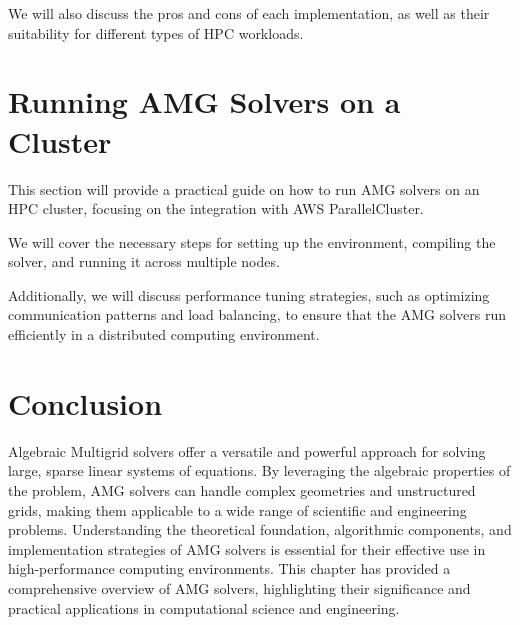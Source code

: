 We will also discuss the pros and cons of each implementation, as well as their suitability for different types of HPC workloads.

\section{Running AMG Solvers on a Cluster}
This section will provide a practical guide on how to run AMG solvers on an HPC cluster, focusing on the integration with AWS ParallelCluster. 

We will cover the necessary steps for setting up the environment, compiling the solver, and running it across multiple nodes. 

Additionally, we will discuss performance tuning strategies, such as optimizing communication patterns and load balancing, to ensure that the AMG solvers run efficiently in a distributed computing environment.

\section{Conclusion}

Algebraic Multigrid solvers offer a versatile and powerful approach for solving large, sparse linear systems of equations. By leveraging the algebraic properties of the problem, AMG solvers can handle complex geometries and unstructured grids, making them applicable to a wide range of scientific and engineering problems. Understanding the theoretical foundation, algorithmic components, and implementation strategies of AMG solvers is essential for their effective use in high-performance computing environments. This chapter has provided a comprehensive overview of AMG solvers, highlighting their significance and practical applications in computational science and engineering.